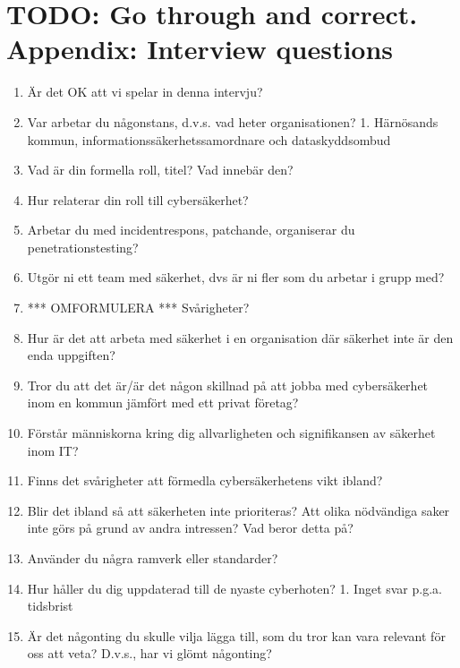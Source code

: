 \documentclass{article}
\begin{document}
\section{TODO: Go through and correct. Appendix: Interview questions}
\begin{enumerate}
    \item Är det OK att vi spelar in denna intervju?
    \item Var arbetar du någonstans, d.v.s. vad heter organisationen?
        1. Härnösands kommun, informationssäkerhetssamordnare och dataskyddsombud
    \item Vad är din formella roll, titel? Vad innebär den?
    \item Hur relaterar din roll till cybersäkerhet?
    \item Arbetar du med incidentrespons, patchande, organiserar du penetrationstesting?
    \item Utgör ni ett team med säkerhet, dvs är ni fler som du arbetar i grupp med?
    \item *** OMFORMULERA *** Svårigheter?
    \item Hur är det att arbeta med säkerhet i en organisation där säkerhet inte är den enda uppgiften?
    \item Tror du att det är/är det någon skillnad på att jobba med cybersäkerhet inom en kommun jämfört med ett privat företag?
    \item Förstår människorna kring dig allvarligheten och signifikansen av säkerhet inom IT?
    \item Finns det svårigheter att förmedla cybersäkerhetens vikt ibland? 
    \item Blir det ibland så att säkerheten inte prioriteras? Att olika nödvändiga saker inte görs på grund av andra intressen? Vad beror detta på?
    \item Använder du några ramverk eller standarder?
    \item Hur håller du dig uppdaterad till de nyaste cyberhoten?
        1. Inget svar p.g.a. tidsbrist
    \item Är det någonting du skulle vilja lägga till, som du tror kan vara relevant för oss att veta? D.v.s., har vi glömt någonting?
\end{enumerate}
\end{document}
